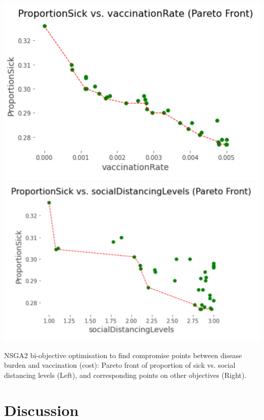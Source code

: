 {%


\includegraphics[width=0.49\linewidth]{../figures/pareto.png}
\includegraphics[width=0.49\linewidth]{../figures/pareto2.png}

\bigskip

NSGA2 bi-objective optimisation to find compromise points between disease burden and vaccination (cost): Pareto front of proportion of sick vs. social distancing levels (Left), and corresponding points on other objectives (Right).

}

\section{Discussion}


